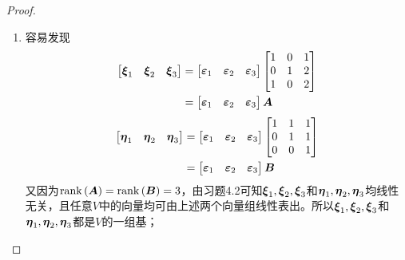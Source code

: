 \begin{proof}
    \begin{enumerate}
        \item {
              容易发现
              \begin{align*}
                  \begin{bmatrix}\boldsymbol{\xi}_1&\boldsymbol{\xi}_2&\boldsymbol{\xi}_3\end{bmatrix}
                   & =
                  \begin{bmatrix}\boldsymbol{\varepsilon}_1&\boldsymbol{\varepsilon}_2&\boldsymbol{\varepsilon}_3\end{bmatrix}
                  \begin{bmatrix}
                      1 & 0 & 1 \\
                      0 & 1 & 2 \\
                      1 & 0 & 2
                  \end{bmatrix}                                                        \\
                   & =\begin{bmatrix}\boldsymbol{\varepsilon}_1&\boldsymbol{\varepsilon}_2&\boldsymbol{\varepsilon}_3\end{bmatrix}\boldsymbol{A}
              \end{align*}
              \begin{align*}
                  \begin{bmatrix}\boldsymbol{\eta}_1&\boldsymbol{\eta}_2&\boldsymbol{\eta}_3\end{bmatrix}
                   & =
                  \begin{bmatrix}\boldsymbol{\varepsilon}_1&\boldsymbol{\varepsilon}_2&\boldsymbol{\varepsilon}_3\end{bmatrix}
                  \begin{bmatrix}
                      1 & 1 & 1 \\
                      0 & 1 & 1 \\
                      0 & 0 & 1
                  \end{bmatrix}                                                        \\
                   & =\begin{bmatrix}\boldsymbol{\varepsilon}_1&\boldsymbol{\varepsilon}_2&\boldsymbol{\varepsilon}_3\end{bmatrix}\boldsymbol{B}
              \end{align*}
              又因为\(\mathrm{rank}\left( \boldsymbol{A} \right)=\mathrm{rank}\left( \boldsymbol{B} \right)=3\)，由习题4.2可知\(\boldsymbol{\xi}_1,\boldsymbol{\xi}_2,\boldsymbol{\xi}_3\)和\(\boldsymbol{\eta}_1,\boldsymbol{\eta}_2,\boldsymbol{\eta}_3\)均线性无关，且任意\(V\)中的向量均可由上述两个向量组线性表出。所以\(\boldsymbol{\xi}_1,\boldsymbol{\xi}_2,\boldsymbol{\xi}_3\)和\(\boldsymbol{\eta}_1,\boldsymbol{\eta}_2,\boldsymbol{\eta}_3\)都是\(V\)的一组基；
}
\end{enumerate}
\end{proof}
